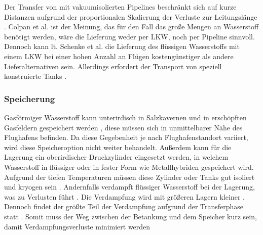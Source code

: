Der Transfer von  mit vakuumisolierten Pipelines beschränkt sich auf kurze Distanzen
aufgrund der proportionalen Skalierung der Verluste zur Leitungslänge \cite{colpan2022fuel}.
%
Colpan et al. \cite{colpan2022fuel} ist der Meinung, 
das für den Fall das große Mengen an Wasserstoff benötigt werden, 
wäre die Lieferung weder per LKW, noch per Pipeline sinnvoll. 
%
Dennoch kann lt. Schenke et al. \cite{schenke2024lh2} die Lieferung des flüssigen Wasserstoffs 
mit einem LKW bei einer hohen Anzahl an Flügen kostengünstiger als andere Lieferalternativen sein.
Allerdings erfordert der Transport von  speziell konstruierte Tanks \cite{mulder2019outlook}.
%
%
%
\subsubsection{Speicherung}
Gasförmiger Wasserstoff kann unterirdisch in Salzkavernen 
und in erschöpften Gasfeldern gespeichert werden \cite{undertaking2022strategic}, 
diese müssen sich in unmittelbarer Nähe des Flughafens befinden. 
Da diese Gegebenheit je nach Flughafenstandort variiert, 
wird diese Speicheroption nicht weiter behandelt.
Außerdem kann für die Lagerung ein oberirdischer Druckzylinder eingesetzt werden, 
in welchem Wasserstoff in flüssiger oder in fester Form wie Metallhybriden gespeichert wird.
Aufgrund der tiefen Temperaturen müssen diese Zylinder oder Tanks gut isoliert und kryogen sein \cite{undertaking2022strategic}.
Andernfalls verdampft flüssiger Wasserstoff bei der Lagerung, 
was zu Verlusten führt \cite{undertaking2022strategic}. 
Die Verdampfung wird mit größeren Lagern kleiner \cite{colpan2022fuel}.
%
Dennoch findet der größte Teil der Verdampfung aufgrund 
der Transferphase statt \cite{undertaking2022strategic}.
Somit muss der Weg zwischen der Betankung und dem Speicher kurz sein, 
damit Verdampfungsverluste minimiert werden \cite{colpan2022fuel}

